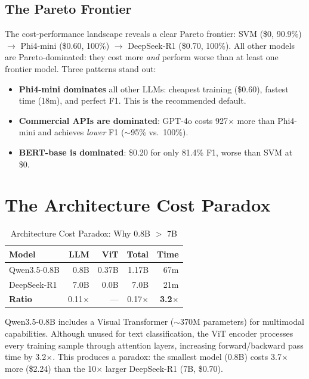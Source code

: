 \documentclass[review,3p]{elsarticle}
\begin{document}
\subsection{The Pareto Frontier}
The cost-performance landscape reveals a clear Pareto frontier: SVM (\$0, 90.9\%) $\to$ Phi4-mini (\$0.60, 100\%) $\to$ DeepSeek-R1 (\$0.70, 100\%). All other models are Pareto-dominated: they cost more \emph{and} perform worse than at least one frontier model. Three patterns stand out:
\begin{itemize}
\item \textbf{Phi4-mini dominates} all other LLMs: cheapest training (\$0.60), fastest time (18m), and perfect F1. This is the recommended default.
\item \textbf{Commercial APIs are dominated}: GPT-4o costs 927$\times$ more than Phi4-mini and achieves \emph{lower} F1 ($\sim$95\% vs.\ 100\%).
\item \textbf{BERT-base is dominated}: \$0.20 for only 81.4\% F1, worse than SVM at \$0.
\end{itemize}

\section{The Architecture Cost Paradox}

\begin{table}[!ht]
\centering
\caption{Architecture Cost Paradox: Why 0.8B $>$ 7B}
\label{tab:paradox}
\begin{tabular}{lrrrr}
\toprule
\textbf{Model} & \textbf{LLM} & \textbf{ViT} & \textbf{Total} & \textbf{Time} \\
\midrule
Qwen3.5-0.8B & 0.8B & 0.37B & 1.17B & 67m \\
DeepSeek-R1 & 7.0B & 0.0B & 7.0B & 21m \\
\midrule
\textbf{Ratio} & 0.11$\times$ & --- & 0.17$\times$ & \textbf{3.2$\times$} \\
\bottomrule
\end{tabular}
\end{table}

Qwen3.5-0.8B includes a Visual Transformer ($\sim$370M parameters) for multimodal capabilities. Although unused for text classification, the ViT encoder processes every training sample through attention layers, increasing forward/backward pass time by 3.2$\times$. This produces a paradox: the smallest model (0.8B) costs 3.7$\times$ more (\$2.24) than the 10$\times$ larger DeepSeek-R1 (7B, \$0.70).
\end{document}
